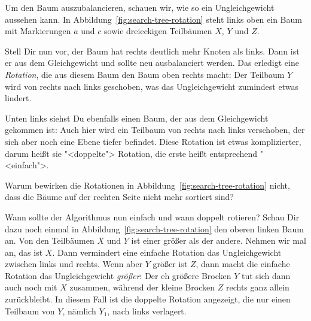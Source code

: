 Um den Baum auszubalancieren, schauen wir, wie so ein
Ungleichgewicht aussehen kann.  In
Abbildung~\ref{fig:search-tree-rotation} steht links oben ein
Baum mit Markierungen $a$ und $c$ sowie dreieckigen Teilbäumen $X$,
$Y$ und $Z$.

Stell Dir nun vor, der Baum hat rechts deutlich mehr
Knoten als links.  Dann ist er aus dem Gleichgewicht und sollte neu
ausbalanciert werden.
Das erledigt eine \textit{Rotation},
die aus diesem Baum den Baum oben rechts macht: Der
Teilbaum $Y$ wird von rechts nach links geschoben, was das Ungleichgewicht
zumindest etwas lindert.

Unten links siehst Du ebenfalls einen Baum, der aus dem Gleichgewicht
gekommen ist: Auch hier wird ein Teilbaum von rechts nach links
verschoben, der sich aber noch eine Ebene tiefer be\-findet.  Diese
Rotation ist etwas komplizierter, darum heißt sie "<doppelte">
Rotation, die erste heißt entsprechend "<einfach">.

\pagebreak[4]

\begin{aufgabeinline}
  Warum bewirken die Rotationen in
  Abbildung~\ref{fig:search-tree-rotation} nicht, dass die Bäume auf
  der rechten Seite nicht mehr sortiert sind?
\end{aufgabeinline}
%
Wann sollte der Algorithmus nun einfach und wann doppelt rotieren?
Schau Dir dazu noch einmal in Abbildung~\ref{fig:search-tree-rotation}
den oberen linken Baum an.  Von den Teilbäumen $X$ und $Y$ ist einer
größer als der andere.  Nehmen wir mal an, das ist $X$.  Dann
vermindert eine einfache Rotation das Ungleichgewicht zwischen links
und rechts.
Wenn aber $Y$ größer ist $Z$, dann macht die einfache Rotation das
Ungleichgewicht \emph{größer}: Der eh größere Brocken $Y$ tut sich
dann auch noch mit $X$ zusammen, während der kleine Brocken $Z$ rechts
ganz allein zurückbleibt.  In diesem Fall ist die doppelte Rotation
angezeigt, die nur einen Teilbaum von $Y$, nämlich $Y_1$, nach links
verlagert.

